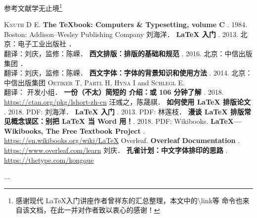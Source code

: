 \documentclass[fontset = none, t]{ctexbeamer}
\begin{document}
\begin{frame}[fragile]{参考文献}{学无止境\footnote[frame,1]{感谢现代
      \LaTeX 入门讲座作者曾祥东的汇总整理，本文中的{\textbackslash link}等
      命令也来自该文档，在此一并对作者致以衷心的感谢！}}
\begin{spacing}{1.3}
\begin{multicols}{2}
\tiny
\newcommand\BOOK[1]{\textbf{#1}}
\newcommand\TAG[1]{\CASE{[#1]}}
\begin{thebibliography}{99}
  \bibitem{}
    \textsc{Knuth D E}.
    \newblock \BOOK{The \TeX book: Computers \& Typesetting, volume C} \TAG{M}. 1984.
    \newblock Boston: Addison--Wesley Publishing Company
  \bibitem{}
    刘海洋．
    \newblock \BOOK{\LaTeX{} 入门} \TAG{M}. 2013.
    \newblock 北京：电子工业出版社
  \bibitem{}
    ．\\
    翻译：刘庆，监修：陈嵘．
    \newblock \BOOK{西文排版：排版的基础和规范} \TAG{M}. 2016.
    \newblock 北京：中信出版集团
  \bibitem{}
    ．\\
    翻译：刘庆，监修：陈嵘．
    \newblock \BOOK{西文字体：字体的背景知识和使用方法} \TAG{M}. 2014.
    \newblock 北京：中信出版集团
  \bibitem{}
    \textsc{Oetiker T}, \textsc{Partl H}, \textsc{Hyna I} and \textsc{Schlegl E}.\\
    翻译：\CTeX{} 开发小组．
    \newblock \BOOK{一份（不太）简短的 \LaTeXe{} 介绍：或 106 分钟了解 \LaTeXe{}} \TAG{EB/OL}. 2018.
    \newblock \url{https://ctan.org/pkg/lshort-zh-cn}
  \bibitem{}
    汪彧之，陈晟祺．
    \newblock \BOOK{如何使用 \LaTeX{} 排版论文} \TAG{EB/OL}. 2018.
    \newblock PDF:
      \href{https://github.com/tuna/thulib-latex-talk/raw/master/latex-talk.pdf}{\faDownload}
  \bibitem{}
    刘海洋．
    \newblock \BOOK{\LaTeX{} 入门} \TAG{EB/OL}. 2013.
    \newblock PDF:
      \href{https://bbs.pku.edu.cn/attach/e7/f2/e7f2bb698b9c3672/tex_intro_talk.pdf}{\faDownload}
  \bibitem{}
    林莲枝．
    \newblock \BOOK{漫谈 \LaTeX{} 排版常见概念误区：别把 \LaTeX{} 当 Word 用！}\TAG{EB/OL}. 2018.
    \newblock PDF:
      \href{http://static.latexstudio.net/wp-content/uploads/2018/03/LianTze-presentation-0320-forReading.pdf}{\faDownload}
  \bibitem{}
    Wikibooks.
    \newblock \BOOK{\LaTeX{}---Wikibooks, The Free Textbook Project} \TAG{EB/OL}.
    \newblock \url{https://en.wikibooks.org/wiki/LaTeX}
  \bibitem{}
    Overleaf.
    \newblock \BOOK{Overleaf Documentation} \TAG{EB/OL}.
    \newblock \url{https://www.overleaf.com/learn}
  \bibitem{}
    刘庆．
    \newblock \BOOK{孔雀计划：中文字体排印的思路} \TAG{EB/OL}.
    \newblock \url{https://thetype.com/kongque}
\end{thebibliography}
\end{multicols}
\end{spacing}
\end{frame}

\begin{frame}
  ...
\end{frame}
\end{document}
